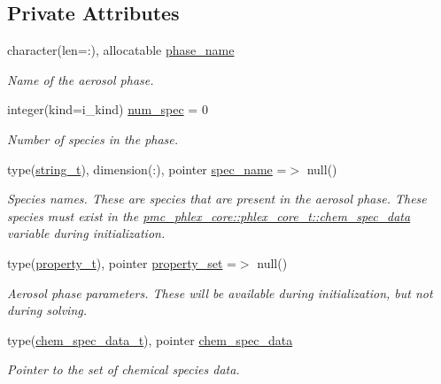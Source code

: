 \subsection*{Private Attributes}
\begin{DoxyCompactItemize}
\item 
character(len=\+:), allocatable \mbox{\hyperlink{structpmc__aero__phase__data_1_1aero__phase__data__t_a6b432657e1385cc12e69d30d8aee02aa}{phase\+\_\+name}}
\begin{DoxyCompactList}\small\item\em Name of the aerosol phase. \end{DoxyCompactList}\item 
integer(kind=i\+\_\+kind) \mbox{\hyperlink{structpmc__aero__phase__data_1_1aero__phase__data__t_a5d60d405506f43cedb9802a5a082deb5}{num\+\_\+spec}} = 0
\begin{DoxyCompactList}\small\item\em Number of species in the phase. \end{DoxyCompactList}\item 
type(\mbox{\hyperlink{structpmc__util_1_1string__t}{string\+\_\+t}}), dimension(\+:), pointer \mbox{\hyperlink{structpmc__aero__phase__data_1_1aero__phase__data__t_a53090761d1563647a5eedcdf09bba7d6}{spec\+\_\+name}} =$>$ null()
\begin{DoxyCompactList}\small\item\em Species names. These are species that are present in the aerosol phase. These species must exist in the {\ttfamily \mbox{\hyperlink{structpmc__phlex__core_1_1phlex__core__t_aff3bb5cb12638af6de6ee3b8b65a1fb3}{pmc\+\_\+phlex\+\_\+core\+::phlex\+\_\+core\+\_\+t\+::chem\+\_\+spec\+\_\+data}}} variable during initialization. \end{DoxyCompactList}\item 
type(\mbox{\hyperlink{structpmc__property_1_1property__t}{property\+\_\+t}}), pointer \mbox{\hyperlink{structpmc__aero__phase__data_1_1aero__phase__data__t_a933032cf31aa9181bd253643bca911a7}{property\+\_\+set}} =$>$ null()
\begin{DoxyCompactList}\small\item\em Aerosol phase parameters. These will be available during initialization, but not during solving. \end{DoxyCompactList}\item 
type(\mbox{\hyperlink{structpmc__chem__spec__data_1_1chem__spec__data__t}{chem\+\_\+spec\+\_\+data\+\_\+t}}), pointer \mbox{\hyperlink{structpmc__aero__phase__data_1_1aero__phase__data__t_ab1f0f88ebed688e68925ffa725928bc0}{chem\+\_\+spec\+\_\+data}}
\begin{DoxyCompactList}\small\item\em Pointer to the set of chemical species data. \end{DoxyCompactList}\end{DoxyCompactItemize}


